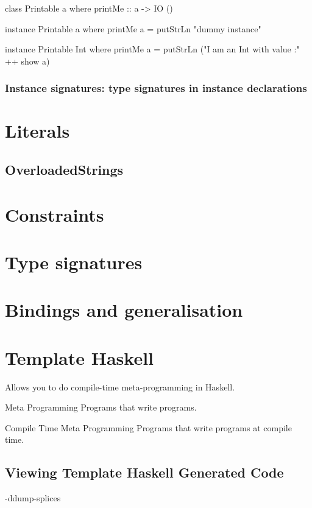 \documentclass[openany, 12pt]{book}
\begin{document}
\begin{haskell}{}
\begin{haskell}{}
class Printable a where
    printMe :: a -> IO ()

instance Printable a where
    printMe a = putStrLn "dummy instance"

instance Printable Int where
    printMe a = putStrLn ("I am an Int with value :" ++ show a)
\end{haskell}

\section{Instance signatures: type signatures in instance declarations}

\part{Literals}
\chapter{OverloadedStrings}

\part{Constraints}
\part{Type signatures}
\part{Bindings and generalisation}
\part{Template Haskell}
Allows you to do compile-time meta-programming in Haskell.

\begin{definition}{Meta Programming}{}
	Programs that write programs.
\end{definition}

\begin{definition}{Compile Time Meta Programming}{}
	Programs that write programs at compile time.
\end{definition}

\setcounter{chapter}{2}
\chapter{Viewing Template Haskell Generated Code}
\begin{haskell}{}
-ddump-splices
\end{haskell}


\end{haskell}
\end{document}
